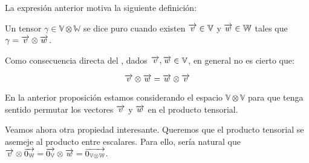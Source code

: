 La expresión anterior motiva la siguiente definición:

\begin{definicion} \label{def:tensor_puro}
	Un tensor $\gamma \in \mathbb{V} \otimes \mathbb{W}$ se dice puro cuando existen $\overrightarrow{v} \in \mathbb{V}$ y $\overrightarrow{w} \in \mathbb{W}$ tales que $\gamma = \overrightarrow{v} \otimes \overrightarrow{w}$.
\end{definicion}

\begin{proposicion}
	Como consecuencia directa del , dados $\overrightarrow{v}, \overrightarrow{w} \in \mathbb{V}$, en general no es cierto que:

	\begin{equation}
		\overrightarrow{v} \otimes \overrightarrow{w} = \overrightarrow{w} \otimes \overrightarrow{v}
	\end{equation}

	\begin{observacion}
		En la anterior proposición estamos considerando el espacio $\mathbb{V} \otimes \mathbb{V}$ para que tenga sentido permutar los vectores $\overrightarrow{v}$ y $\overrightarrow{w}$ en el producto tensorial.
	\end{observacion}
\end{proposicion}

Veamos ahora otra propiedad interesante. Queremos que el producto tensorial se asemeje al producto entre escalares. Para ello, sería natural que $\overrightarrow{v} \otimes \overrightarrow{0_\mathbb{W}} = \overrightarrow{0_{\mathbb{V}}} \otimes \overrightarrow{w} = \overrightarrow{0_{\mathbb{V} \otimes \mathbb{W}}}$.

